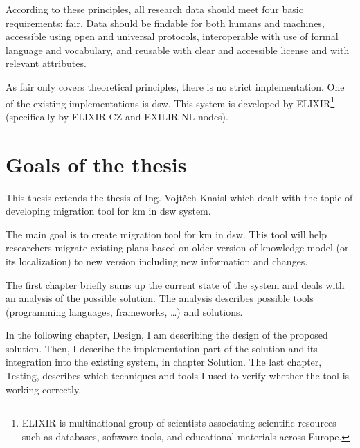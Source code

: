 According to these principles, all research data should meet four basic requirements: \gls{fair}.
Data should be findable for both humans and machines, accessible using open and universal protocols, interoperable with use of formal language and vocabulary, and reusable with clear and accessible license and with relevant attributes.

As \gls{fair} only covers theoretical principles, there is no strict implementation.
One of the existing implementations is \gls{dsw}.
This system is developed by ELIXIR\footnote{ELIXIR is multinational group of scientists associating scientific resources such as databases, software tools, and educational materials across Europe.} (specifically by ELIXIR CZ and EXILIR NL nodes).

\section*{Goals of the thesis}

This thesis extends the thesis of Ing. Vojtěch Knaisl which dealt with the topic of developing migration tool for \gls{km} in \gls{dsw} system.

The main goal is to create migration tool for \gls{km} in \gls{dsw}.
This tool will help researchers migrate existing plans based on older version of knowledge model (or its localization) to new version including new information and changes.

\medskip

The first chapter briefly sums up the current state of the system and deals with an analysis of the possible solution.
The analysis describes possible tools (programming languages, frameworks, \dots) and solutions.

In the following chapter, Design, I am describing the design of the proposed solution.
Then, I describe the implementation part of the solution and its integration into the existing system, in chapter Solution.
The last chapter, Testing, describes which techniques and tools I used to verify whether the tool is working correctly.
